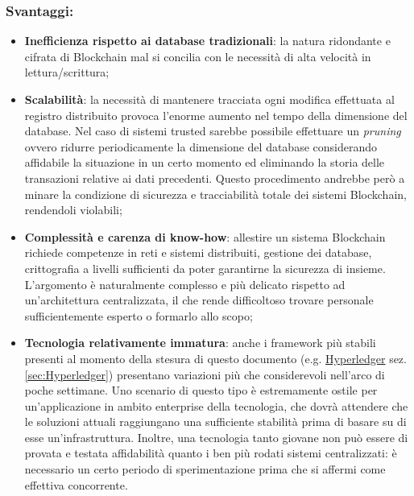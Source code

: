 		\subsubsection{Svantaggi:}
			\begin{itemize}
				\item \textbf{Inefficienza rispetto ai database tradizionali}: la natura ridondante e cifrata di Blockchain mal si concilia con le necessità di alta velocità in lettura/scrittura;
				\item \textbf{Scalabilità}: la necessità di mantenere tracciata ogni modifica effettuata al registro distribuito provoca l'enorme aumento nel tempo della dimensione del database. Nel caso di sistemi trusted sarebbe possibile effettuare un \emph{pruning}\label{pruning} ovvero ridurre periodicamente la dimensione del database considerando affidabile la situazione in un certo momento ed eliminando la storia delle transazioni relative ai dati precedenti. Questo procedimento andrebbe però a minare la condizione di sicurezza e tracciabilità totale dei sistemi Blockchain, rendendoli violabili;
				\item \textbf{Complessità e carenza di know-how}: allestire un sistema Blockchain richiede competenze in reti e sistemi distribuiti, gestione dei database, crittografia a livelli sufficienti da poter garantirne la sicurezza di insieme. L'argomento è naturalmente complesso e più delicato rispetto ad un'architettura centralizzata, il che rende difficoltoso trovare personale sufficientemente esperto o formarlo allo scopo;
				\item \textbf{Tecnologia relativamente immatura}: anche i framework più stabili presenti al momento della stesura di questo documento (e.g. \hyperref[sec:Hyperledger]{Hyperledger} sez. \ref{sec:Hyperledger}) presentano variazioni più che considerevoli nell'arco di poche settimane. Uno scenario di questo tipo è estremamente ostile per un'applicazione in ambito enterprise della tecnologia, che dovrà attendere che le soluzioni attuali raggiungano una sufficiente stabilità prima di basare su di esse un'infrastruttura. Inoltre, una tecnologia tanto giovane non può essere di provata e testata affidabilità quanto i ben più rodati sistemi centralizzati: è necessario un certo periodo di sperimentazione prima che si affermi come effettiva concorrente.
			\end{itemize}
		
